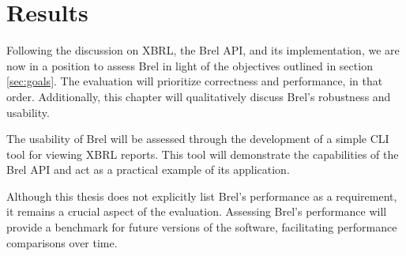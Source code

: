 \chapter{Results}
\label{chapter:results}






Following the discussion on XBRL, the Brel API, and its implementation, 
we are now in a position to assess Brel in light of the objectives outlined in section \ref{sec:goals}. 
The evaluation will prioritize correctness and performance, in that order. 
Additionally, this chapter will qualitatively discuss Brel's robustness and usability.

The usability of Brel will be assessed through the development of a simple CLI tool for viewing XBRL reports. 
This tool will demonstrate the capabilities of the Brel API and act as a practical example of its application.

Although this thesis does not explicitly list Brel's performance as a requirement, 
it remains a crucial aspect of the evaluation. 
Assessing Brel's performance will provide a benchmark for future versions of the software, 
facilitating performance comparisons over time.

